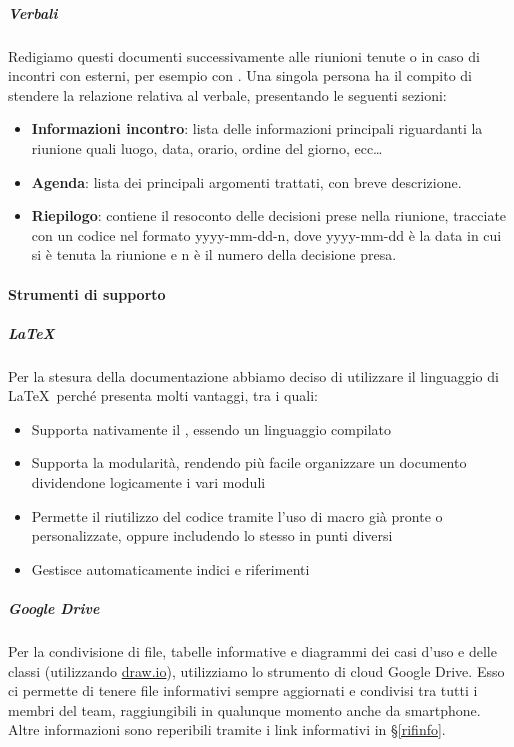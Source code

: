             \subparagraph{Verbali}
			Redigiamo questi documenti successivamente alle riunioni tenute	o in caso di incontri con  esterni, per esempio con \II. Una singola persona ha il compito di stendere
			la relazione relativa al verbale, presentando le seguenti sezioni:
			\begin{itemize}
				\item \textbf{Informazioni incontro}: lista delle informazioni principali riguardanti la riunione quali luogo, data, orario, ordine del giorno, ecc\dots
				\item \textbf{Agenda}: lista dei principali argomenti trattati, con breve descrizione.
				\item \textbf{Riepilogo}: contiene il resoconto delle decisioni prese nella riunione, tracciate con un codice nel formato yyyy-mm-dd-n, dove yyyy-mm-dd è la data in cui si è tenuta la riunione e n è il numero della decisione presa.
				
			\end{itemize}


			\paragraph{Strumenti di supporto}\label{StrumentiDiSupporto}

			\subparagraph{\LaTeX}\label{LaTeX}
			Per la stesura della documentazione abbiamo deciso di utilizzare il linguaggio di  \LaTeX\ perché presenta molti vantaggi, tra i quali:
			\begin{itemize}
				\item Supporta nativamente il , essendo un linguaggio compilato
				\item Supporta la modularità, rendendo più facile organizzare un documento dividendone logicamente i vari moduli
				\item Permette il riutilizzo del codice tramite l'uso di macro già pronte o personalizzate, oppure includendo lo stesso  in punti diversi
				\item Gestisce automaticamente indici e riferimenti
			\end{itemize}

			\subparagraph{Google Drive}\label{GoogleDrive}
			Per la condivisione di file, tabelle informative e diagrammi dei casi d'uso e delle classi (utilizzando \hyperref[drawio]{draw.io}), utilizziamo lo strumento
			di cloud Google Drive. Esso ci permette di tenere file informativi sempre aggiornati e condivisi tra tutti i membri del team, raggiungibili in qualunque momento
			anche da smartphone. Altre informazioni sono reperibili tramite i link informativi in \S\ref{rifinfo}.

